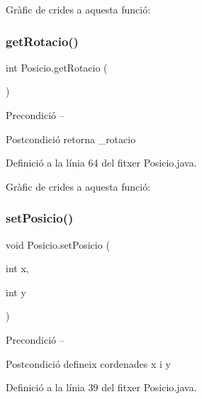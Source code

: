Gràfic de crides a aquesta funció\+:
\mbox{\label{class_posicio_ad41dbf5580623be4bfa053825900c9e9}} 
\subsubsection{\texorpdfstring{get\+Rotacio()}{getRotacio()}}
{\footnotesize\ttfamily int Posicio.\+get\+Rotacio (\begin{DoxyParamCaption}{ }\end{DoxyParamCaption})}

\begin{DoxyPrecond}{Precondició}
-- 
\end{DoxyPrecond}
\begin{DoxyPostcond}{Postcondició}
retorna \+\_\+rotacio 
\end{DoxyPostcond}


Definició a la línia 64 del fitxer Posicio.\+java.

Gràfic de crides a aquesta funció\+:
\mbox{\label{class_posicio_ae5d039250fb3edeaf683c6e39f7495bc}} 
\subsubsection{\texorpdfstring{set\+Posicio()}{setPosicio()}}
{\footnotesize\ttfamily void Posicio.\+set\+Posicio (\begin{DoxyParamCaption}\item[{int}]{x,  }\item[{int}]{y }\end{DoxyParamCaption})}

\begin{DoxyPrecond}{Precondició}
-- 
\end{DoxyPrecond}
\begin{DoxyPostcond}{Postcondició}
defineix cordenades x i y 
\end{DoxyPostcond}


Definició a la línia 39 del fitxer Posicio.\+java.

\mbox{\label{class_posicio_a74e21bbf58a371bbd77a6a9d98953de3}} 
